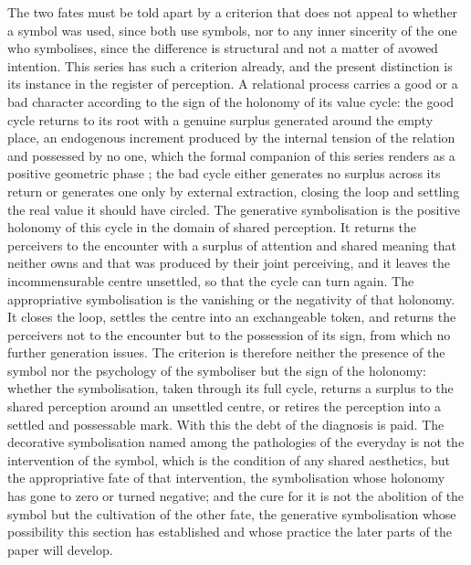The two fates must be told apart by a criterion that does not appeal to whether a symbol was used, since both use symbols, nor to any inner sincerity of the one who symbolises, since the difference is structural and not a matter of avowed intention. This series has such a criterion already, and the present distinction is its instance in the register of perception. A relational process carries a good or a bad character according to the sign of the holonomy of its value cycle: the good cycle returns to its root with a genuine surplus generated around the empty place, an endogenous increment produced by the internal tension of the relation and possessed by no one, which the formal companion of this series renders as a positive geometric phase \parencite{berry1984,paperix}; the bad cycle either generates no surplus across its return or generates one only by external extraction, closing the loop and settling the real value it should have circled. The generative symbolisation is the positive holonomy of this cycle in the domain of shared perception. It returns the perceivers to the encounter with a surplus of attention and shared meaning that neither owns and that was produced by their joint perceiving, and it leaves the incommensurable centre unsettled, so that the cycle can turn again. The appropriative symbolisation is the vanishing or the negativity of that holonomy. It closes the loop, settles the centre into an exchangeable token, and returns the perceivers not to the encounter but to the possession of its sign, from which no further generation issues. The criterion is therefore neither the presence of the symbol nor the psychology of the symboliser but the sign of the holonomy: whether the symbolisation, taken through its full cycle, returns a surplus to the shared perception around an unsettled centre, or retires the perception into a settled and possessable mark. With this the debt of the diagnosis is paid. The decorative symbolisation named among the pathologies of the everyday is not the intervention of the symbol, which is the condition of any shared aesthetics, but the appropriative fate of that intervention, the symbolisation whose holonomy has gone to zero or turned negative; and the cure for it is not the abolition of the symbol but the cultivation of the other fate, the generative symbolisation whose possibility this section has established and whose practice the later parts of the paper will develop.
